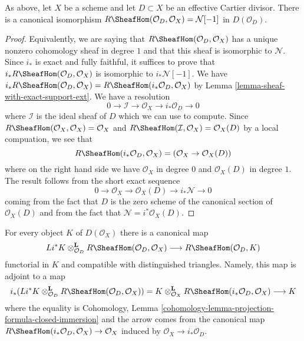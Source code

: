 \begin{lemma}
\label{lemma-compute-for-effective-Cartier}
As above, let $X$ be a scheme and let $D \subset X$ be an
effective Cartier divisor. There is a canonical isomorphism
$R\SheafHom(\mathcal{O}_D, \mathcal{O}_X) = \mathcal{N}[-1]$
in $D(\mathcal{O}_D)$.
\end{lemma}

\begin{proof}
Equivalently, we are saying that $R\SheafHom(\mathcal{O}_D, \mathcal{O}_X)$
has a unique nonzero cohomology sheaf in degree $1$ and that this
sheaf is isomorphic to $\mathcal{N}$. Since $i_*$ is exact and fully
faithful, it suffices to prove that
$i_*R\SheafHom(\mathcal{O}_D, \mathcal{O}_X)$ is isomorphic
to $i_*\mathcal{N}[-1]$. We have
$i_*R\SheafHom(\mathcal{O}_D, \mathcal{O}_X) =
R\SheafHom(i_*\mathcal{O}_D, \mathcal{O}_X)$
by Lemma \ref{lemma-sheaf-with-exact-support-ext}. We have a resolution
$$
0 \to \mathcal{I} \to \mathcal{O}_X \to i_*\mathcal{O}_D \to 0
$$
where $\mathcal{I}$ is the ideal sheaf of $D$
which we can use to compute. Since
$R\SheafHom(\mathcal{O}_X, \mathcal{O}_X) = \mathcal{O}_X$ and
$R\SheafHom(\mathcal{I}, \mathcal{O}_X) = \mathcal{O}_X(D)$ by
a local compuation, we see that
$$
R\SheafHom(i_*\mathcal{O}_D, \mathcal{O}_X) =
(\mathcal{O}_X \to \mathcal{O}_X(D))
$$
where on the right hand side we have $\mathcal{O}_X$ in degree $0$
and $\mathcal{O}_X(D)$ in degree $1$. The result follows from the
short exact sequence
$$
0 \to \mathcal{O}_X \to \mathcal{O}_X(D) \to i_*\mathcal{N} \to 0
$$
coming from the fact that $D$ is the zero scheme of the canonical section
of $\mathcal{O}_X(D)$ and from the fact that
$\mathcal{N} = i^*\mathcal{O}_X(D)$.
\end{proof}

\noindent
For every object $K$ of $D(\mathcal{O}_X)$ there is a canonical map
\begin{equation}
\label{equation-map-effective-Cartier}
Li^*K
\otimes_{\mathcal{O}_D}^\mathbf{L}
R\SheafHom(\mathcal{O}_D, \mathcal{O}_X)
\longrightarrow
R\SheafHom(\mathcal{O}_D, K)
\end{equation}
functorial in $K$ and compatible with distinguished triangles.
Namely, this map is adjoint to a map
$$
i_*(Li^*K \otimes^\mathbf{L}_{\mathcal{O}_D}
R\SheafHom(\mathcal{O}_D, \mathcal{O}_X)) =
K \otimes^\mathbf{L}_{\mathcal{O}_X}
R\SheafHom(i_*\mathcal{O}_D, \mathcal{O}_X)
\longrightarrow K
$$
where the equality is
Cohomology, Lemma \ref{cohomology-lemma-projection-formula-closed-immersion}
and the arrow comes from the canonical map
$R\SheafHom(i_*\mathcal{O}_D, \mathcal{O}_X) \to \mathcal{O}_X$
induced by $\mathcal{O}_X \to i_*\mathcal{O}_D$.

